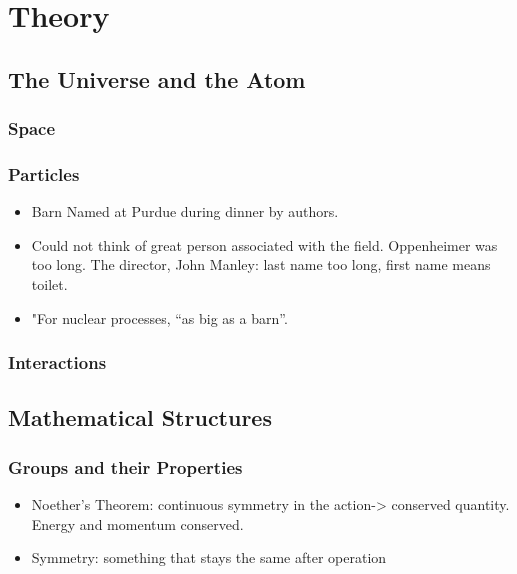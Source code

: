 \chapter{Theory}

\section{The Universe and the Atom}

\subsection{Space}

\subsection{Particles}
\begin{itemize}
    \item Barn Named at Purdue during dinner by authors. \cite{holloway}
    \item Could not think of great person associated with the field. Oppenheimer was too long. The director, John Manley: last name too long, first name means toilet. \cite{holloway}
    \item "For nuclear processes, ``as big as a barn''. \cite{holloway}
\end{itemize}

\subsection{Interactions}


\section{Mathematical Structures}

\subsection{Groups and their Properties}
\begin{itemize}
    \item Noether's Theorem: continuous symmetry in the action-> conserved quantity. Energy and momentum conserved. \cite{robinson}
    \item Symmetry: something that stays the same after operation \cite{robinson}
\end{itemize}

